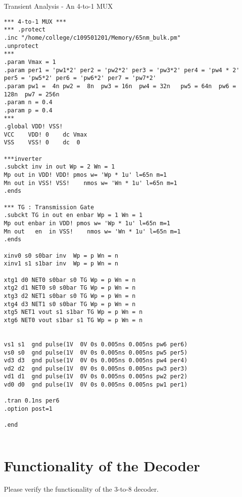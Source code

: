 \documentclass[a4paper]{article}
\newenvironment{code}{\captionsetup{type=listing, font=large, name=List.}}{}
\begin{document}
\begin{code}
    \caption{Transient Analysis - An 4-to-1 MUX}
    \begin{verbatim}
*** 4-to-1 MUX ***
*** .protect
.inc "/home/college/c109501201/Memory/65nm_bulk.pm"
.unprotect
*** 
.param Vmax = 1
.param per1 = 'pw1*2' per2 = 'pw2*2' per3 = 'pw3*2' per4 = 'pw4 * 2' per5 = 'pw5*2' per6 = 'pw6*2' per7 = 'pw7*2'
.param pw1 =  4n pw2 =  8n  pw3 = 16n  pw4 = 32n   pw5 = 64n  pw6 = 128n  pw7 = 256n
.param n = 0.4
.param p = 0.4
***
.global VDD! VSS! 
VCC    VDD! 0    dc Vmax
VSS    VSS! 0    dc  0

***inverter
.subckt inv in out Wp = 2 Wn = 1
Mp out in VDD! VDD! pmos w= 'Wp * 1u' l=65n m=1
Mn out in VSS! VSS!    nmos w= 'Wn * 1u' l=65n m=1
.ends

*** TG : Transmission Gate
.subckt TG in out en enbar Wp = 1 Wn = 1
Mp out enbar in VDD! pmos w= 'Wp * 1u' l=65n m=1
Mn out   en  in VSS!    nmos w= 'Wn * 1u' l=65n m=1
.ends

xinv0 s0 s0bar inv  Wp = p Wn = n
xinv1 s1 s1bar inv  Wp = p Wn = n

xtg1 d0 NET0 s0bar s0 TG Wp = p Wn = n
xtg2 d1 NET0 s0 s0bar TG Wp = p Wn = n
xtg3 d2 NET1 s0bar s0 TG Wp = p Wn = n
xtg4 d3 NET1 s0 s0bar TG Wp = p Wn = n
xtg5 NET1 vout s1 s1bar TG Wp = p Wn = n
xtg6 NET0 vout s1bar s1 TG Wp = p Wn = n


vs1 s1  gnd pulse(1V  0V 0s 0.005ns 0.005ns pw6 per6)
vs0 s0  gnd pulse(1V  0V 0s 0.005ns 0.005ns pw5 per5)
vd3 d3  gnd pulse(1V  0V 0s 0.005ns 0.005ns pw4 per4)
vd2 d2  gnd pulse(1V  0V 0s 0.005ns 0.005ns pw3 per3)
vd1 d1  gnd pulse(1V  0V 0s 0.005ns 0.005ns pw2 per2)
vd0 d0  gnd pulse(1V  0V 0s 0.005ns 0.005ns pw1 per1)

.tran 0.1ns per6
.option post=1

.end
        
\end{verbatim}
    \end{code}

\section{Functionality of the Decoder}

Please verify the functionality of the 3-to-8 decoder.
\end{document}
